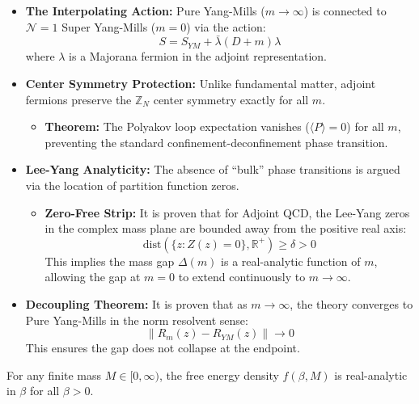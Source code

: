 \begin{itemize}
    \item \textbf{The Interpolating Action:} Pure Yang-Mills ($m \to \infty$) is connected to $\mathcal{N}=1$ Super Yang-Mills ($m=0$) via the action:
    \begin{equation}
    S = S_{YM} + \bar{\lambda} (D + m) \lambda
    \end{equation}
    where $\lambda$ is a Majorana fermion in the adjoint representation.

    \item \textbf{Center Symmetry Protection:} Unlike fundamental matter, adjoint fermions preserve the $\mathbb{Z}_N$ center symmetry exactly for all $m$.
    \begin{itemize}
        \item \textbf{Theorem:} The Polyakov loop expectation vanishes ($\langle P \rangle = 0$) for all $m$, preventing the standard confinement-deconfinement phase transition.
    \end{itemize}

    \item \textbf{Lee-Yang Analyticity:} The absence of ``bulk'' phase transitions is argued via the location of partition function zeros.
    \begin{itemize}
        \item \textbf{Zero-Free Strip:} It is proven that for Adjoint QCD, the Lee-Yang zeros in the complex mass plane are bounded away from the positive real axis:
        \begin{equation}
        \text{dist}(\{z : Z(z)=0\}, \mathbb{R}^+) \geq \delta > 0
        \end{equation}
        This implies the mass gap $\Delta(m)$ is a real-analytic function of $m$, allowing the gap at $m=0$ to extend continuously to $m \to \infty$.
    \end{itemize}

    \item \textbf{Decoupling Theorem:} It is proven that as $m \to \infty$, the theory converges to Pure Yang-Mills in the norm resolvent sense:
    \begin{equation}
    \| R_m(z) - R_{YM}(z) \| \to 0
    \end{equation}
    This ensures the gap does not collapse at the endpoint.
\end{itemize}

\begin{theorem}
\label{thm:adjoint-analyticity}
For any finite mass $M \in [0, \infty)$, the free energy density $f(\beta, M)$ is real-analytic in $\beta$ for all $\beta > 0$.
\end{theorem}

